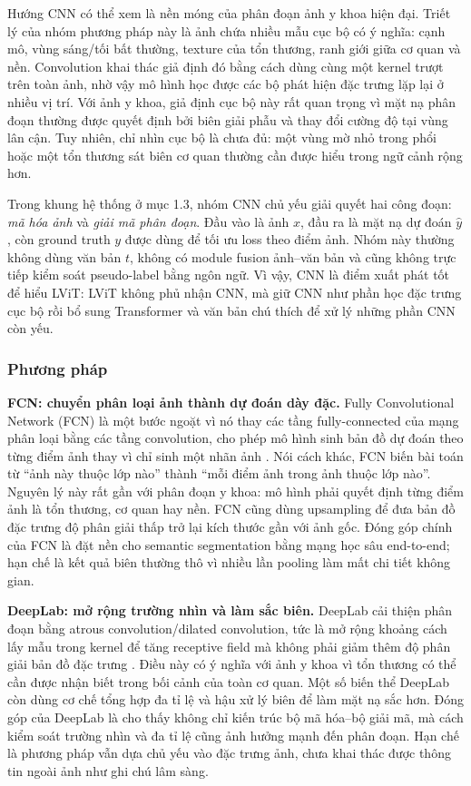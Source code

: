 Hướng CNN có thể xem là nền móng của phân đoạn ảnh y khoa hiện đại. Triết lý của nhóm phương pháp này là ảnh chứa nhiều mẫu cục bộ có ý nghĩa: cạnh mô, vùng sáng/tối bất thường, texture của tổn thương, ranh giới giữa cơ quan và nền. Convolution khai thác giả định đó bằng cách dùng cùng một kernel trượt trên toàn ảnh, nhờ vậy mô hình học được các bộ phát hiện đặc trưng lặp lại ở nhiều vị trí. Với ảnh y khoa, giả định cục bộ này rất quan trọng vì mặt nạ phân đoạn thường được quyết định bởi biên giải phẫu và thay đổi cường độ tại vùng lân cận. Tuy nhiên, chỉ nhìn cục bộ là chưa đủ: một vùng mờ nhỏ trong phổi hoặc một tổn thương sát biên cơ quan thường cần được hiểu trong ngữ cảnh rộng hơn.

Trong khung hệ thống ở mục 1.3, nhóm CNN chủ yếu giải quyết hai công đoạn: \textit{mã hóa ảnh} và \textit{giải mã phân đoạn}. Đầu vào là ảnh \(x\), đầu ra là mặt nạ dự đoán \(\hat{y}\), còn ground truth \(y\) được dùng để tối ưu loss theo điểm ảnh. Nhóm này thường không dùng văn bản \(t\), không có module fusion ảnh--văn bản và cũng không trực tiếp kiểm soát pseudo-label bằng ngôn ngữ. Vì vậy, CNN là điểm xuất phát tốt để hiểu LViT: LViT không phủ nhận CNN, mà giữ CNN như phần học đặc trưng cục bộ rồi bổ sung Transformer và văn bản chú thích để xử lý những phần CNN còn yếu.

\subsubsection{Phương pháp}

\textbf{FCN: chuyển phân loại ảnh thành dự đoán dày đặc.} Fully Convolutional Network (FCN) là một bước ngoặt vì nó thay các tầng fully-connected của mạng phân loại bằng các tầng convolution, cho phép mô hình sinh bản đồ dự đoán theo từng điểm ảnh thay vì chỉ sinh một nhãn ảnh \cite{long2015fcn}. Nói cách khác, FCN biến bài toán từ ``ảnh này thuộc lớp nào'' thành ``mỗi điểm ảnh trong ảnh thuộc lớp nào''. Nguyên lý này rất gần với phân đoạn y khoa: mô hình phải quyết định từng điểm ảnh là tổn thương, cơ quan hay nền. FCN cũng dùng upsampling để đưa bản đồ đặc trưng độ phân giải thấp trở lại kích thước gần với ảnh gốc. Đóng góp chính của FCN là đặt nền cho semantic segmentation bằng mạng học sâu end-to-end; hạn chế là kết quả biên thường thô vì nhiều lần pooling làm mất chi tiết không gian.

\textbf{DeepLab: mở rộng trường nhìn và làm sắc biên.} DeepLab cải thiện phân đoạn bằng atrous convolution/dilated convolution, tức là mở rộng khoảng cách lấy mẫu trong kernel để tăng receptive field mà không phải giảm thêm độ phân giải bản đồ đặc trưng \cite{chen2018deeplab}. Điều này có ý nghĩa với ảnh y khoa vì tổn thương có thể cần được nhận biết trong bối cảnh của toàn cơ quan. Một số biến thể DeepLab còn dùng cơ chế tổng hợp đa tỉ lệ và hậu xử lý biên để làm mặt nạ sắc hơn. Đóng góp của DeepLab là cho thấy không chỉ kiến trúc bộ mã hóa--bộ giải mã, mà cách kiểm soát trường nhìn và đa tỉ lệ cũng ảnh hưởng mạnh đến phân đoạn. Hạn chế là phương pháp vẫn dựa chủ yếu vào đặc trưng ảnh, chưa khai thác được thông tin ngoài ảnh như ghi chú lâm sàng.


